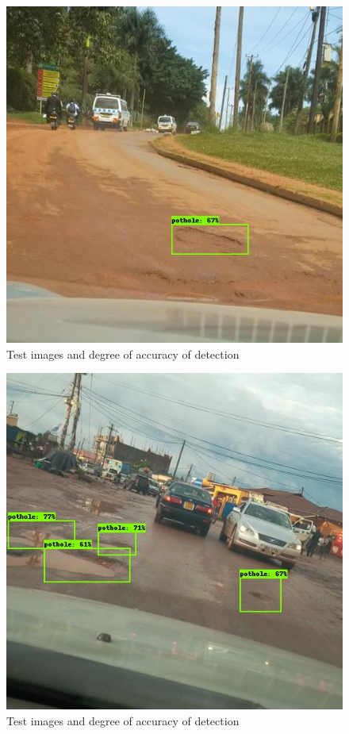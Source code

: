\documentclass[12pt]{report}
\begin{document}
\begin{figure}[H]\includegraphics[scale=0.6]{3.jpg}\centering\caption{Test images and degree of accuracy of detection} \label{fig:Test Images} \end{figure}%
\begin{figure}[H]\includegraphics[scale=0.6]{5.jpg}\centering\caption{Test images and degree of accuracy of detection} \label{fig:Test Images} \end{figure}%
\end{document}
